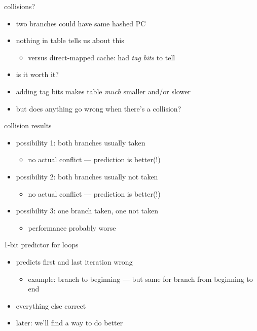 \begin{frame}{collisions?}
\begin{itemize}
\item two branches could have same hashed PC
\item nothing in table tells us about this
    \begin{itemize}
    \item versus direct-mapped cache: had \textit{tag bits} to tell
    \end{itemize}
\vspace{.5cm}
\item is it worth it?
\item adding tag bits makes table \textit{much} smaller and/or slower
\item but does anything go wrong when there's a collision?
\end{itemize}
\end{frame}

\begin{frame}{collision results}
\begin{itemize}
\item possibility 1: both branches usually taken
    \begin{itemize}
    \item no actual conflict --- prediction is better(!)
    \end{itemize}
\item possibility 2: both branches usually not taken
    \begin{itemize}
    \item no actual conflict --- prediction is better(!)
    \end{itemize}
\item possibility 3: one  branch taken, one not taken
    \begin{itemize}
    \item performance probably worse
    \end{itemize}
\end{itemize}
\end{frame}

\begin{frame}{1-bit predictor for loops}
\begin{itemize}
\item predicts first and last iteration wrong
    \begin{itemize}
    \item example: branch to beginning --- but same for branch from beginning to end
    \end{itemize}
\item everything else correct
\vspace{.5cm}
\item later: we'll find a way to do better
\end{itemize}
\end{frame}

